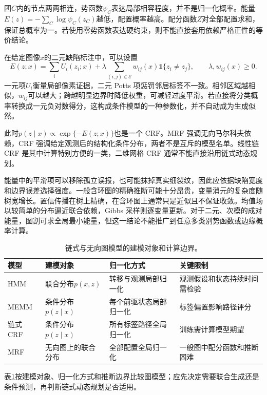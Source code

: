 团$C$内的节点两两相连，势函数$\psi_C$表达局部相容程度，并不是归一化概率。能量$E(z)=-\sum_C\log\psi_C(z_C)$越低，配置概率越高。配分函数$Z$对全部配置求和，保证总概率为一。若使用零势函数表达硬约束，则不能直接套用依赖严格正性的等价结论。

在给定图像$x$的二元缺陷标注中，可以设置
\begin{equation}
 E(z;x)=\sum_i U_i(z_i;x)+\lambda\sum_{(i,j)\in\mathcal E}
 w_{ij}(x)\mathbb 1\{z_i\ne z_j\},\qquad \lambda,w_{ij}(x)\geq0.
\end{equation}
一元项$U_i$衡量局部像素证据，二元 Potts 项惩罚邻居标签不一致。相邻区域越相似，$w_{ij}$可以越大；跨越明显边界时降低权重，可减轻过度平滑。若直接将分类概率转换成一元负对数得分，这构成条件模型的一种参数化，并不自动成为生成似然。

此时$p(z\mid x)\propto\exp\{-E(z;x)\}$也是一个 CRF。MRF 强调无向马尔科夫依赖，CRF 强调给定观测后的结构化条件分布，两者不是互斥的模型名单。线性链 CRF 是其中计算特别方便的一类，二维网格 CRF 通常不能直接沿用链式动态规划。

能量中的平滑项可以移除孤立误报，也可能抹掉真实细裂纹，因此应依据缺陷宽度和边界误差选择强度。一般含环图的精确推断可能十分昂贵，变量消元的复杂度随树宽增长。置信传播在树上精确，在含环图上通常只是近似且不保证收敛。均值场以较简单的分布逼近联合依赖，Gibbs 采样则逐变量更新。对于二元、次模的成对能量，图割可求全局最小能量，但这一结论不能推广到任意多类别势函数或边缘概率计算。

\begin{table}[htbp]
\centering
\caption{链式与无向图模型的建模对象和计算边界。}
\label{tab:bayes-graph-models}
\small
\begin{tabular}{p{1.3cm}p{3.1cm}p{3.3cm}p{4.2cm}}
\hline
模型 & 建模对象 & 归一化方式 & 关键限制 \\
\hline
HMM & 联合分布$p(x,z)$ & 转移与观测局部归一化 & 观测假设和状态持续时间需检验 \\
MEMM & 条件分布$p(z\mid x)$ & 每个前驱状态局部归一化 & 标签偏置影响路径评分 \\
链式 CRF & 条件分布$p(z\mid x)$ & 所有标签路径全局归一化 & 训练需计算模型期望 \\
MRF & 无向图上的联合分布 & 全部配置全局归一化 & 一般图中配分函数和推断困难 \\
\hline
\end{tabular}
\end{table}

表\ref{tab:bayes-graph-models}按建模对象、归一化方式和推断边界比较图模型；应先决定需要联合生成还是条件预测，再判断链式动态规划是否适用。
